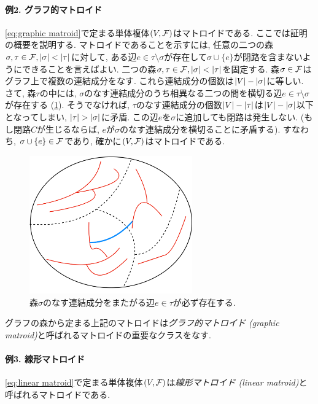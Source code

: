\paragraph*{例2. グラフ的マトロイド}
\cref{eq:graphic matroid}で定まる単体複体$(V,\mathcal{F})$はマトロイドである.
ここでは証明の概要を説明する.
マトロイドであることを示すには, 任意の二つの森$\sigma,\tau \in \mathcal{F},\lvert\sigma\rvert < \lvert\tau\rvert$に対して, ある辺$e\in \tau\setminus \sigma$が存在して$\sigma\cup\{e\}$が閉路を含まないようにできることを言えばよい.
二つの森$\sigma,\tau \in \mathcal{F},\lvert\sigma\rvert < \lvert\tau\rvert$を固定する.
森$\sigma\in \mathcal{F}$はグラフ上で複数の連結成分をなす.
これら連結成分の個数は$|V| - \lvert\sigma\rvert$に等しい.
さて, 森$\tau$の中には, $\sigma$のなす連結成分のうち相異なる二つの間を横切る辺$e \in \tau \setminus \sigma$が存在する (\cref{fig:graphicmatroid}).
そうでなければ, $\tau$のなす連結成分の個数$|V|-\lvert\tau\rvert$は$|V|-\lvert\sigma\rvert$以下となってしまい, $\lvert\tau\rvert > \lvert\sigma\rvert$に矛盾.
この辺$e$を$\sigma$に追加しても閉路は発生しない.
(もし閉路$C$が生じるならば, $e$が$\sigma$のなす連結成分を横切ることに矛盾する).
すなわち, $\sigma\cup\{e\}\in\mathcal{F}$であり, 確かに$(V,\mathcal{F})$はマトロイドである.
%
\begin{figure}
    \begin{center}
    \includegraphics[width=7cm]{images/graphicmatroid.png}
    \caption{森$\sigma$のなす連結成分をまたがる辺$e \in \tau$が必ず存在する. \label{fig:graphicmatroid}}
    \end{center}
\end{figure}

グラフの森から定まる上記のマトロイドは\emph{グラフ的マトロイド (graphic matroid)}と呼ばれるマトロイドの重要なクラスをなす.

%
\paragraph*{例3. 線形マトロイド}
\cref{eq:linear matroid}で定まる単体複体$(V,\mathcal{F})$は\emph{線形マトロイド (linear matroid)}と呼ばれるマトロイドである.

